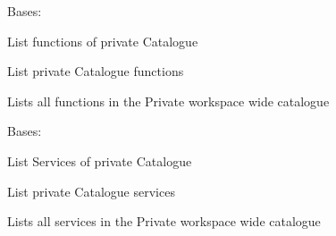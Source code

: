 \documentclass[letterpaper,10pt,english]{sphinxmanual}
\begin{document}
\begin{fulllineitems}
\label{_source/son_editor.apis:son_editor.apis.workspacesapi.PrivateFunctions}
Bases: 

List functions of private Catalogue

\begin{fulllineitems}
\label{_source/son_editor.apis:son_editor.apis.workspacesapi.PrivateFunctions.get}
List private Catalogue functions

Lists all functions in the Private workspace wide catalogue

\end{fulllineitems}


\begin{fulllineitems}
\label{_source/son_editor.apis:son_editor.apis.workspacesapi.PrivateFunctions.methods}
\end{fulllineitems}


\end{fulllineitems}


\begin{fulllineitems}
\label{_source/son_editor.apis:son_editor.apis.workspacesapi.PrivateServices}
Bases: 

List Services of private Catalogue

\begin{fulllineitems}
\label{_source/son_editor.apis:son_editor.apis.workspacesapi.PrivateServices.get}
List private Catalogue services

Lists all services in the Private workspace wide catalogue

\end{fulllineitems}


\begin{fulllineitems}
\label{_source/son_editor.apis:son_editor.apis.workspacesapi.PrivateServices.methods}
\end{fulllineitems}


\end{fulllineitems}
\end{document}
